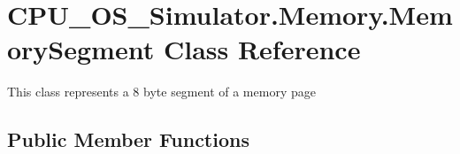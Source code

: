 \hypertarget{class_c_p_u___o_s___simulator_1_1_memory_1_1_memory_segment}{}\section{C\+P\+U\+\_\+\+O\+S\+\_\+\+Simulator.\+Memory.\+Memory\+Segment Class Reference}
\label{class_c_p_u___o_s___simulator_1_1_memory_1_1_memory_segment}


This class represents a 8 byte segment of a memory page  


\subsection*{Public Member Functions}
